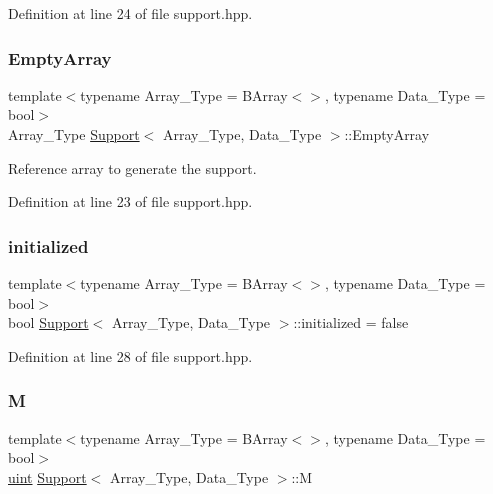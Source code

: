 Definition at line 24 of file support.\+hpp.

\mbox{\label{class_support_a9364028f9966697e3cdd3fc6a5cd90de}} 
\subsubsection{\texorpdfstring{Empty\+Array}{EmptyArray}}
{\footnotesize\ttfamily template$<$typename Array\+\_\+\+Type = B\+Array$<$$>$, typename Data\+\_\+\+Type = bool$>$ \\
Array\+\_\+\+Type \hyperlink{class_support}{Support}$<$ Array\+\_\+\+Type, Data\+\_\+\+Type $>$\+::Empty\+Array}



Reference array to generate the support. 



Definition at line 23 of file support.\+hpp.

\mbox{\label{class_support_ac352c6473720fcdcd9895c48bd872ef5}} 
\subsubsection{\texorpdfstring{initialized}{initialized}}
{\footnotesize\ttfamily template$<$typename Array\+\_\+\+Type = B\+Array$<$$>$, typename Data\+\_\+\+Type = bool$>$ \\
bool \hyperlink{class_support}{Support}$<$ Array\+\_\+\+Type, Data\+\_\+\+Type $>$\+::initialized = false}



Definition at line 28 of file support.\+hpp.

\mbox{\label{class_support_ace1d46b871c67caa774ac2269930e97f}} 
\subsubsection{\texorpdfstring{M}{M}}
{\footnotesize\ttfamily template$<$typename Array\+\_\+\+Type = B\+Array$<$$>$, typename Data\+\_\+\+Type = bool$>$ \\
\hyperlink{typedefs_8hpp_a91ad9478d81a7aaf2593e8d9c3d06a14}{uint} \hyperlink{class_support}{Support}$<$ Array\+\_\+\+Type, Data\+\_\+\+Type $>$\+::M}



